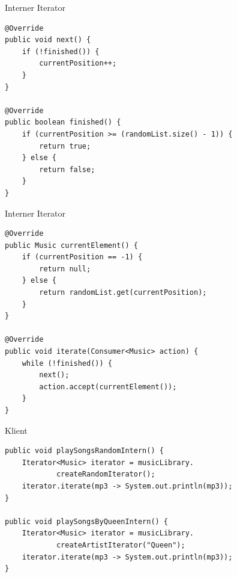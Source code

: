 \begin{frame}[fragile]{Interner Iterator}
	\begin{exampleblock}{}
 		\begin{lstlisting}
@Override
public void next() {
    if (!finished()) {
        currentPosition++;
    }
}

@Override
public boolean finished() {
    if (currentPosition >= (randomList.size() - 1)) {
        return true;
    } else {
        return false;
    }
}
 		\end{lstlisting}
 	\end{exampleblock}
\end{frame}

\begin{frame}[fragile]{Interner Iterator}
	\begin{exampleblock}{}
 		\begin{lstlisting}
@Override
public Music currentElement() {
    if (currentPosition == -1) {
        return null;
    } else {
        return randomList.get(currentPosition);
    }
}

@Override
public void iterate(Consumer<Music> action) {
    while (!finished()) {
        next();
        action.accept(currentElement());
    }
}
 		\end{lstlisting}
 	\end{exampleblock}
\end{frame}

\begin{frame}[fragile]{Klient}
	\begin{exampleblock}{}
 		\begin{lstlisting}
public void playSongsRandomIntern() {
    Iterator<Music> iterator = musicLibrary.
            createRandomIterator();
    iterator.iterate(mp3 -> System.out.println(mp3));
}

public void playSongsByQueenIntern() {
    Iterator<Music> iterator = musicLibrary.
            createArtistIterator("Queen");
    iterator.iterate(mp3 -> System.out.println(mp3));
}
 		\end{lstlisting}
 	\end{exampleblock}
\end{frame}


